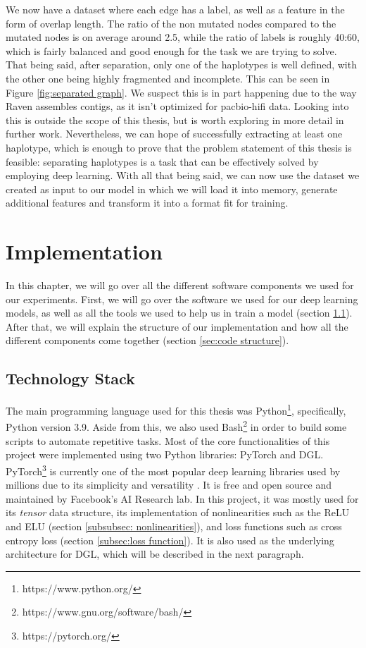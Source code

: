 \documentclass[times, utf8, diplomski, english]{fer_eng}
\begin{document}
We now have a dataset where each edge has a label, as well as a feature in the form of overlap length. The ratio of the non mutated nodes compared to the mutated nodes is on average around 2.5, while the ratio of labels is roughly 40:60, which is fairly balanced and good enough for the task we are trying to solve. That being said, after separation, only one of the haplotypes is well defined, with the other one being highly fragmented and incomplete. This can be seen in Figure \ref{fig:separated graph}. We suspect this is in part happening due to the way Raven assembles contigs, as it isn't optimized for pacbio-hifi data. Looking into this is outside the scope of this thesis, but is worth exploring in more detail in further work. Nevertheless, we can hope of successfully extracting at least one haplotype, which is enough to prove that the problem statement of this thesis is feasible: separating haplotypes is a task that can be effectively solved by employing deep learning. With all that being said, we can now use the dataset we created as input to our model in which we will load it into memory, generate additional features and transform it into a format fit for training.

\chapter{Implementation}

In this chapter, we will go over all the different software components we used for our experiments. First, we will go over the software we used for our deep learning models, as well as all the tools we used to help us in train a model (section \ref{sec:technology stack}). After that, we will explain the structure of our implementation and how all the different components come together (section \ref{sec:code structure}).

\section{Technology Stack}
\label{sec:technology stack}

The main programming language used for this thesis was Python\footnote{https://www.python.org/}, specifically, Python version 3.9. Aside from this, we also used Bash\footnote{https://www.gnu.org/software/bash/} in order to build some scripts to automate repetitive tasks. Most of the core functionalities of this project were implemented using two Python libraries: PyTorch and DGL. PyTorch\footnote{https://pytorch.org/} is currently one of the most popular deep learning libraries used by millions due to its simplicity and versatility \cite{popular_ml}. It is free and open source and maintained by Facebook's AI Research lab. In this project, it was mostly used for its \textit{tensor} data structure, its implementation of nonlinearities such as the ReLU and ELU (section \ref{subsubsec: nonlinearities}), and loss functions such as cross entropy loss (section \ref{subsec:loss function}). It is also used as the underlying architecture for DGL, which will be described in the next paragraph.
\end{document}
